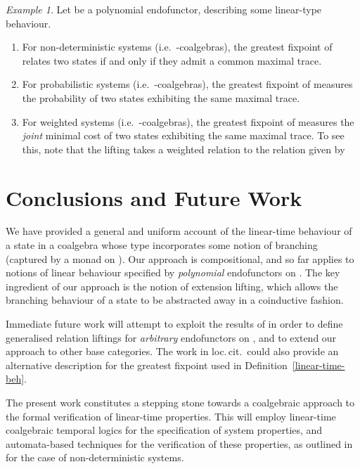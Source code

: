 \documentclass[submission,copyright,creativecommons]{eptcs}
\theoremstyle{plain}\newtheorem{theorem}{Theorem}[section]
\theoremstyle{remark}
\newtheorem{example}[remark]{Example}
\begin{document}
\begin{example}Let  be a polynomial endofunctor, describing some linear-type behaviour.
\begin{enumerate}
\item For non-deterministic systems (i.e.~-coalgebras), the greatest fixpoint of  relates two states if and only if they admit a common maximal trace.
\item For probabilistic systems (i.e.~-coalgebras), the greatest fixpoint of  measures the probability of two states exhibiting the same maximal trace.

\item For weighted systems (i.e.~-coalgebras), the greatest fixpoint of  measures the \emph{joint} minimal cost of two states exhibiting the same maximal trace. To see this, note that the lifting  takes a weighted relation  to the relation  given by


\end{enumerate}
\end{example}

\section{Conclusions and Future Work}

We have provided a general and uniform account of the linear-time behaviour of a state in a coalgebra whose type incorporates some notion of branching (captured by a monad on ). Our approach is compositional, and so far applies to notions of linear behaviour specified by \emph{polynomial} endofunctors on . The key ingredient of our approach is the notion of extension lifting, which allows the branching behaviour of a state to be abstracted away in a coinductive fashion.

Immediate future work will attempt to exploit the results of \cite{Ghani2011,Ghani2012} in order to define generalised relation liftings for \emph{arbitrary} endofunctors on , and to extend our approach to other base categories. The work in loc.\,cit.~could also provide an alternative description for the greatest fixpoint used in Definition~\ref{linear-time-beh}.

The present work constitutes a stepping stone towards a coalgebraic approach to the formal verification of linear-time properties. This will employ linear-time coalgebraic temporal logics for the specification of system properties, and automata-based techniques for the verification of these properties, as outlined in \cite{Cirstea11} for the case of non-deterministic systems.


\end{document}
